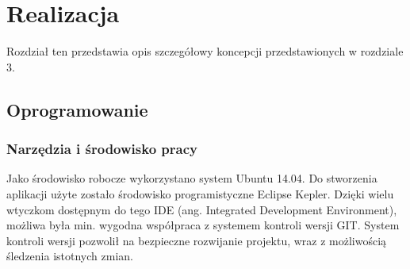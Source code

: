 
\chapter{Realizacja} %

Rozdział ten przedstawia opis szczegółowy koncepcji przedstawionych w rozdziale 3.

\section{Oprogramowanie}
\subsection{Narzędzia i środowisko pracy}
Jako środowisko robocze wykorzystano system Ubuntu 14.04. Do stworzenia aplikacji użyte zostało środowisko programistyczne Eclipse Kepler. Dzięki wielu wtyczkom dostępnym do tego IDE (ang. Integrated Development Environment), możliwa była min. wygodna współpraca z systemem kontroli wersji GIT. System kontroli wersji pozwolił na bezpieczne rozwijanie projektu, wraz z możliwością śledzenia istotnych zmian.


